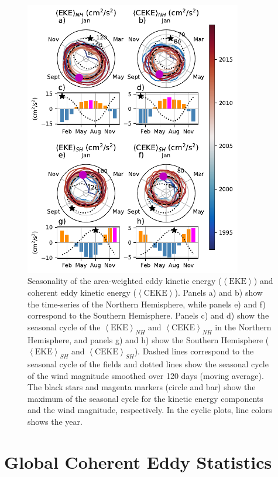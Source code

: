 \documentclass[draft,linenumbers]{agujournal2019}
\newcommand{\EKE}{\textrm{EKE}}
\newcommand{\CEKE}{\textrm{CEKE}}
\begin{document}
	\begin{figure}
	    \centering
	    \includegraphics[width=95mm]{figures/All_polar_plots.pdf}
	    \caption{Seasonality of the area-weighted eddy kinetic energy ($\left<\EKE\right>$) and coherent eddy kinetic energy ($\left<\CEKE\right>$). 
		Panels a) and b) show the time-series of the Northern Hemisphere, while panels e) and f) correspond to the Southern Hemisphere. Panels c) and d) show the seasonal cycle of the $\left<\EKE\right>_{NH}$ and $\left<\CEKE\right>_{NH}$ in the Northern Hemisphere, and panels g) and h) show the Southern Hemisphere ($\left<\EKE\right>_{SH}$ and $\left<\CEKE\right>_{SH}$).
		Dashed lines correspond to the seasonal cycle of the fields and dotted lines show the seasonal cycle of the wind magnitude smoothed over 120 days (moving average). 
		The black stars and magenta markers (circle and bar) show the maximum of the seasonal cycle for the kinetic energy components and the wind magnitude, respectively. In the cyclic plots, line colors shows the year.}
	    \label{fig:eddy_energy_polar}
	\end{figure}
	
	\section{Global Coherent Eddy Statistics}
	\label{sec:CE_stats}
\end{document}
